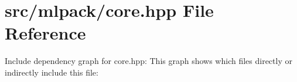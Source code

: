 \section{src/mlpack/core.hpp File Reference}
\label{core_8hpp}
Include dependency graph for core.\-hpp\-:
This graph shows which files directly or indirectly include this file\-:
